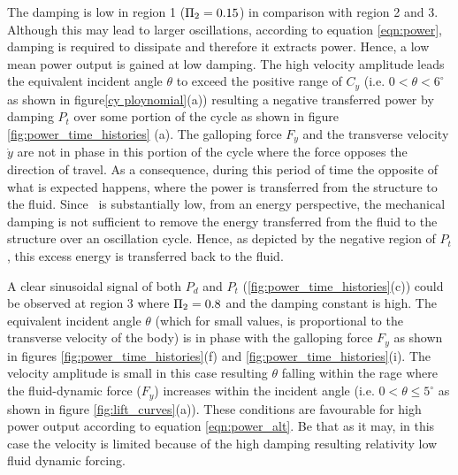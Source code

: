 

The damping is low in region 1 ($\Pi_2=0.15$) in comparison with region 2 and 3. Although this may lead to larger oscillations, according to equation \ref{eqn:power}, damping is required to dissipate and therefore it extracts power. Hence, a low mean power output is gained at low damping. The high velocity amplitude leads the equivalent incident angle $\theta$ to exceed the positive range of $C_y$ (i.e. $0<\theta<6^\circ$ as shown in figure\ref{cy ploynomial}(a)) resulting a negative transferred power by damping $P_t$ over some portion of the cycle as shown in figure \ref{fig:power_time_histories} (a). The galloping force $F_y$ and the transverse velocity $\dot{y}$ are not in phase in this portion of the cycle where the force opposes the direction of travel. As a consequence, during this period of time the opposite of what is expected happens, where the power is transferred from the structure to the fluid. Since \massdamp \ is substantially low, from an energy perspective, the mechanical damping is not sufficient to remove the energy transferred from the fluid to the structure over an oscillation cycle. Hence, as depicted by the negative region of $P_t$, this excess energy is transferred back to the fluid.



A clear sinusoidal signal of both $P_d$ and $P_t$ (\ref{fig:power_time_histories}(c)) could be observed at region 3 where $\Pi_2=0.8$ and the damping constant is high. The equivalent incident angle $\theta$ (which for small values, is proportional to the transverse velocity of the body) is in phase with the galloping force $F_y$ as shown in figures \ref{fig:power_time_histories}(f) and  \ref{fig:power_time_histories}(i). The velocity amplitude is small in this case resulting $\theta$ falling within the rage where the fluid-dynamic force ($F_y$) increases within the incident angle (i.e. $0<\theta \leq 5^\circ$ as shown in figure \ref{fig:lift_curves}(a)). These conditions are favourable for high power output according to equation \ref{eqn:power_alt}. Be that as it may, in this case the velocity is limited because of the high damping resulting relativity low fluid dynamic forcing. 

